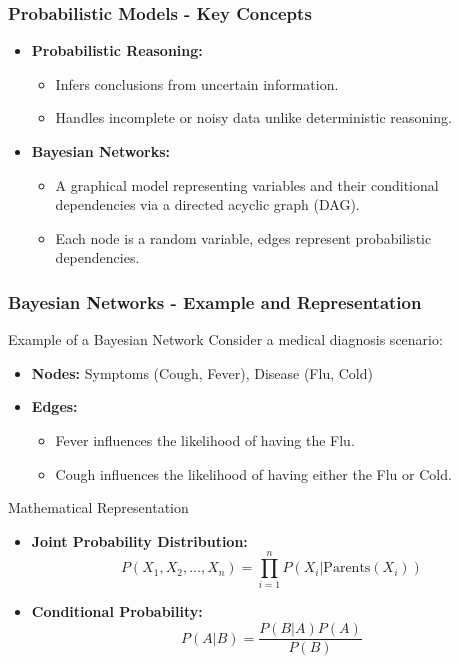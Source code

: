 \documentclass[aspectratio=169]{beamer}
\begin{document}
\begin{frame}[fragile]
    \frametitle{Probabilistic Models - Key Concepts}
    \begin{itemize}
        \item \textbf{Probabilistic Reasoning:} 
        \begin{itemize}
            \item Infers conclusions from uncertain information.
            \item Handles incomplete or noisy data unlike deterministic reasoning.
        \end{itemize}
        
        \item \textbf{Bayesian Networks:}
        \begin{itemize}
            \item A graphical model representing variables and their conditional dependencies via a directed acyclic graph (DAG).
            \item Each node is a random variable, edges represent probabilistic dependencies.
        \end{itemize}
    \end{itemize}
\end{frame}

\begin{frame}[fragile]
    \frametitle{Bayesian Networks - Example and Representation}
    \begin{block}{Example of a Bayesian Network}
        Consider a medical diagnosis scenario:
        \begin{itemize}
            \item \textbf{Nodes:} Symptoms (Cough, Fever), Disease (Flu, Cold)
            \item \textbf{Edges:} 
            \begin{itemize}
                \item Fever influences the likelihood of having the Flu.
                \item Cough influences the likelihood of having either the Flu or Cold.
            \end{itemize}
        \end{itemize}
    \end{block}

    \begin{block}{Mathematical Representation}
        \begin{itemize}
            \item \textbf{Joint Probability Distribution:} 
            \begin{equation}
                P(X_1, X_2, \ldots, X_n) = \prod_{i=1}^{n} P(X_i | \text{Parents}(X_i))
            \end{equation}
            \item \textbf{Conditional Probability:}
            \begin{equation}
                P(A | B) = \frac{P(B | A)P(A)}{P(B)}
            \end{equation}
        \end{itemize}
    \end{block}
\end{frame}
\end{document}
